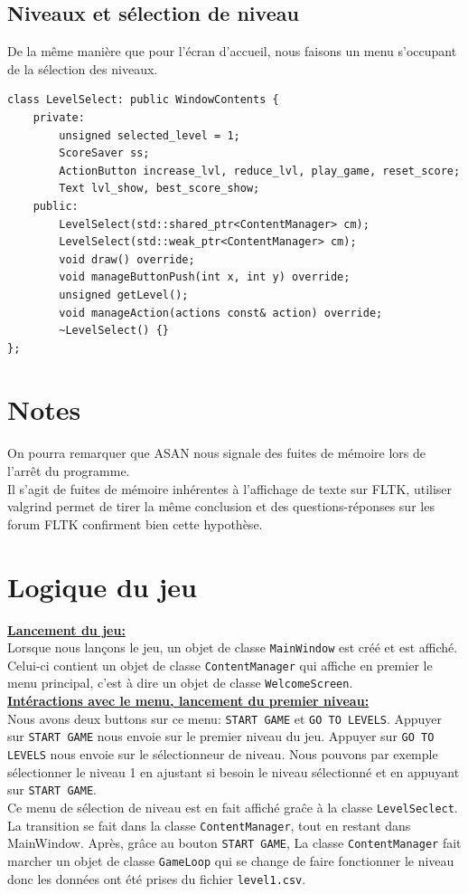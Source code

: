 \documentclass[a4paper, 12pt]{article}
\begin{document}
\subsection{Niveaux et sélection de niveau}

De la même manière que pour l'écran d'accueil, 
nous faisons un menu s'occupant de la sélection des niveaux.
\begin{lstlisting}
class LevelSelect: public WindowContents {
    private:
        unsigned selected_level = 1;
        ScoreSaver ss;
        ActionButton increase_lvl, reduce_lvl, play_game, reset_score;
        Text lvl_show, best_score_show;    
    public:
        LevelSelect(std::shared_ptr<ContentManager> cm);
        LevelSelect(std::weak_ptr<ContentManager> cm);
        void draw() override;
        void manageButtonPush(int x, int y) override;
        unsigned getLevel();
        void manageAction(actions const& action) override;
        ~LevelSelect() {}
};
\end{lstlisting}
\section{Notes}
On pourra remarquer que ASAN nous signale des fuites de mémoire lors de l'arrêt du programme. \\
Il s'agit de fuites de mémoire inhérentes à l'affichage de texte sur FLTK, utiliser valgrind permet de tirer la même conclusion et des questions-réponses sur les forum FLTK confirment bien cette hypothèse.
\pagebreak

\section{Logique du jeu}

\underline{\textbf{Lancement du jeu:}}  \vspace{0.1cm}\\
Lorsque nous lançons le jeu, un objet de classe \texttt{MainWindow} est créé 
et est affiché. 
Celui-ci contient un objet de classe \texttt{ContentManager} qui affiche en premier le
menu principal, c'est à dire un objet de classe \texttt{WelcomeScreen}. \\

\underline{\textbf{Intéractions avec le menu, lancement du premier niveau:}} \vspace{0.1cm} \\
Nous avons deux buttons sur ce menu: \texttt{START GAME} et \texttt{GO TO LEVELS}. 
Appuyer sur \texttt{START GAME} nous envoie sur le premier niveau du jeu.
Appuyer sur \texttt{GO TO LEVELS} nous envoie sur le sélectionneur de niveau.
Nous pouvons par exemple sélectionner le niveau 1 en ajustant si besoin le 
niveau sélectionné et en appuyant sur \texttt{START GAME}. \\
Ce menu de sélection de niveau est en fait affiché graĉe à la classe 
\texttt{LevelSeclect}.
La transition se fait dans la classe \texttt{ContentManager}, 
tout en restant dans MainWindow.
Après, grâce au bouton \texttt{START GAME},
La classe \texttt{ContentManager} fait marcher un objet de classe \texttt{GameLoop}
qui se change de faire fonctionner le niveau donc les données ont été prises du
fichier \texttt{level1.csv}. \\
\end{document}
